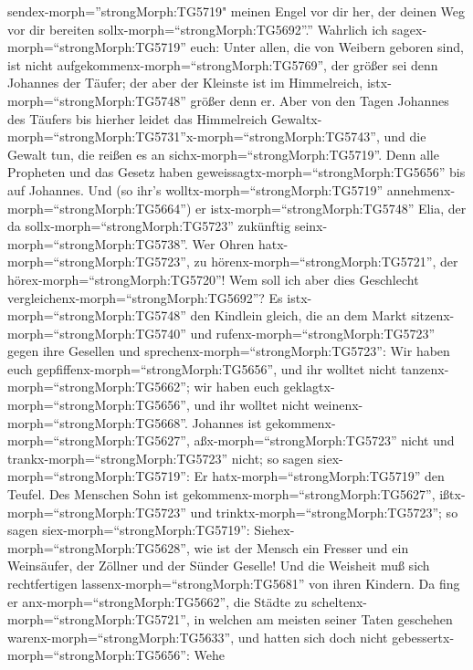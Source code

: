 sendex-morph=''strongMorph:TG5719" meinen Engel vor dir her, der deinen
Weg vor dir bereiten sollx-morph=``strongMorph:TG5692''.'' 
Wahrlich ich sagex-morph=``strongMorph:TG5719'' euch: Unter allen, die
von Weibern geboren sind, ist nicht
aufgekommenx-morph=``strongMorph:TG5769'', der größer sei denn Johannes
der Täufer; der aber der Kleinste ist im Himmelreich,
istx-morph=``strongMorph:TG5748'' größer denn er.  Aber von
den Tagen Johannes des Täufers bis hierher leidet das Himmelreich
Gewaltx-morph=``strongMorph:TG5731''\textbar x-morph=``strongMorph:TG5743'',
und die Gewalt tun, die reißen es an sichx-morph=``strongMorph:TG5719''.
 Denn alle Propheten und das Gesetz haben
geweissagtx-morph=``strongMorph:TG5656'' bis auf Johannes. 
Und (so ihr's wolltx-morph=``strongMorph:TG5719''
annehmenx-morph=``strongMorph:TG5664'') er
istx-morph=``strongMorph:TG5748'' Elia, der da
sollx-morph=``strongMorph:TG5723'' zukünftig
seinx-morph=``strongMorph:TG5738''.  Wer Ohren
hatx-morph=``strongMorph:TG5723'', zu
hörenx-morph=``strongMorph:TG5721'', der
hörex-morph=``strongMorph:TG5720''!  Wem soll ich aber dies
Geschlecht vergleichenx-morph=``strongMorph:TG5692''? Es
istx-morph=``strongMorph:TG5748'' den Kindlein gleich, die an dem Markt
sitzenx-morph=``strongMorph:TG5740'' und
rufenx-morph=``strongMorph:TG5723'' gegen ihre Gesellen 
und sprechenx-morph=``strongMorph:TG5723'': Wir haben euch
gepfiffenx-morph=``strongMorph:TG5656'', und ihr wolltet nicht
tanzenx-morph=``strongMorph:TG5662''; wir haben euch
geklagtx-morph=``strongMorph:TG5656'', und ihr wolltet nicht
weinenx-morph=``strongMorph:TG5668''.  Johannes ist
gekommenx-morph=``strongMorph:TG5627'', aßx-morph=``strongMorph:TG5723''
nicht und trankx-morph=``strongMorph:TG5723'' nicht; so sagen
siex-morph=``strongMorph:TG5719'': Er hatx-morph=``strongMorph:TG5719''
den Teufel.  Des Menschen Sohn ist
gekommenx-morph=``strongMorph:TG5627'',
ißtx-morph=``strongMorph:TG5723'' und
trinktx-morph=``strongMorph:TG5723''; so sagen
siex-morph=``strongMorph:TG5719'': Siehex-morph=``strongMorph:TG5628'',
wie ist der Mensch ein Fresser und ein Weinsäufer, der Zöllner und der
Sünder Geselle! Und die Weisheit muß sich rechtfertigen
lassenx-morph=``strongMorph:TG5681'' von ihren Kindern.  Da
fing er anx-morph=``strongMorph:TG5662'', die Städte zu
scheltenx-morph=``strongMorph:TG5721'', in welchen am meisten seiner
Taten geschehen warenx-morph=``strongMorph:TG5633'', und hatten sich
doch nicht gebessertx-morph=``strongMorph:TG5656'':  Wehe
